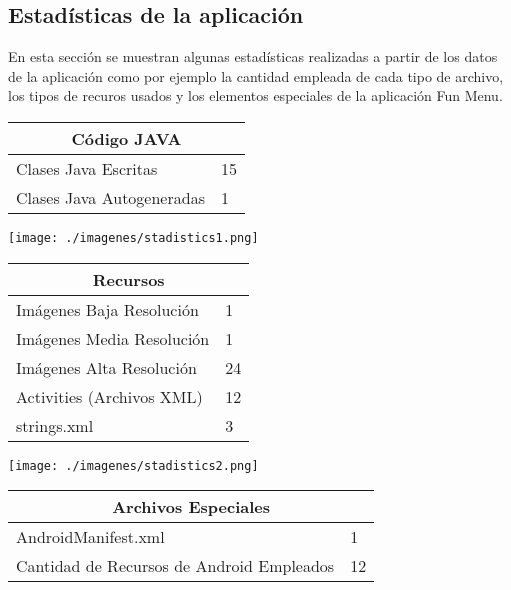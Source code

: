 \documentclass[letterpaper,12pt]{book}
\begin{document}
\begin{mainmatter}
\section{Estadísticas de la aplicación}

En esta sección se muestran algunas estadísticas realizadas a partir de los datos de la
aplicación como por ejemplo la cantidad empleada de cada tipo de archivo, los tipos de recuros usados  y
los elementos especiales de la aplicación Fun Menu.
   
 \begin{tabular}{|l|l|}
    \hline
    \multicolumn{2}{|c|}{Código JAVA} \\ 
    \hline 
    Clases Java Escritas & 15\\ \hline
    Clases Java Autogeneradas & 1 \\ \hline
 \end{tabular}                

\begin{center}
 \texttt{[image: ./imagenes/stadistics1.png]}

\end{center}

 \begin{tabular}{|l|l|}
    \hline
    \multicolumn{2}{|c|}{Recursos} \\ 
    \hline
    Imágenes Baja Resolución & 1\\ \hline
    Imágenes Media Resolución & 1\\ \hline
    Imágenes Alta Resolución & 24\\ \hline
    Activities (Archivos XML) & 12\\ \hline
    strings.xml & 3\\ \hline
 \end{tabular}                

\begin{center}
 \texttt{[image: ./imagenes/stadistics2.png]}

\end{center}

 \begin{tabular}{|l|l|}
    \hline	
    \multicolumn{2}{|c|}{Archivos Especiales} \\ 
    \hline  
    AndroidManifest.xml & 1 \\ \hline
    Cantidad de Recursos de Android Empleados & 12 \\ \hline
\end{tabular}                


\end{mainmatter}
\end{document}

